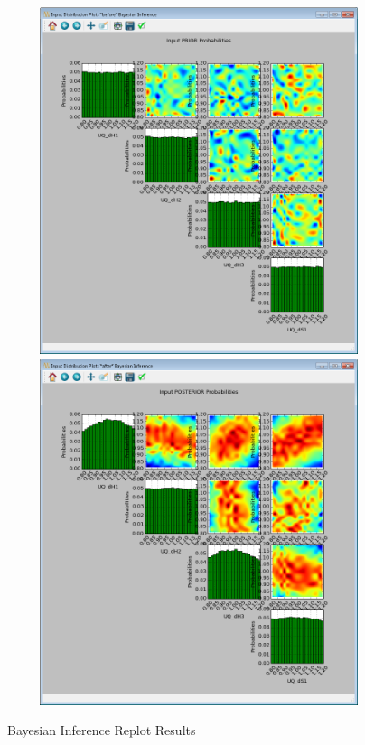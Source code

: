 \begin{figure}[H]
\centering
\includegraphics[width=6.5in,height=4in,keepaspectratio]{Chapt_uq/figs/tutorial/32a_InfPriorReplotResults}
\centering
\includegraphics[width=6.5in,height=4in,keepaspectratio]{Chapt_uq/figs/tutorial/32_InfReplotResults}
\caption{Bayesian Inference Replot Results}
\label{fig:uqt_infer_replot_results}
\end{figure}
